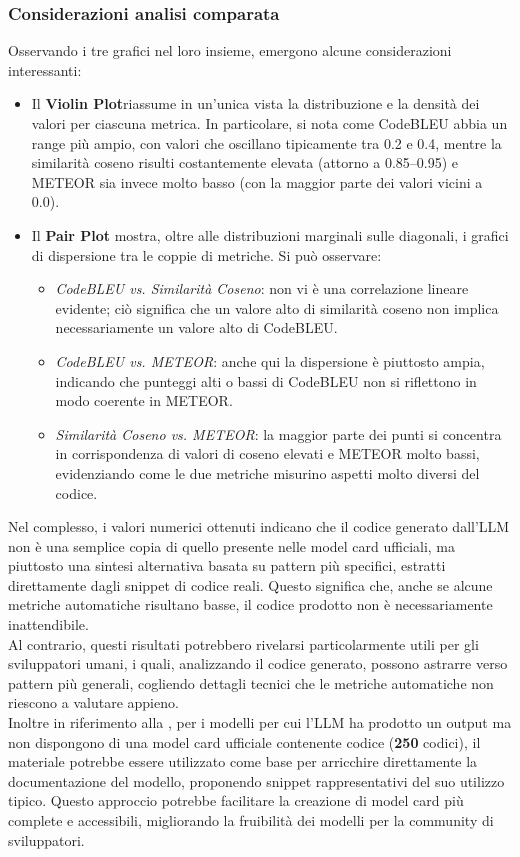 \documentclass{article}
\begin{document}
\subsubsection{Considerazioni analisi comparata} 
Osservando i tre grafici nel loro insieme, emergono alcune considerazioni interessanti:
\begin{itemize} 
\item Il \textbf{Violin Plot}riassume in un’unica vista la distribuzione e la densità dei valori per ciascuna metrica. In particolare, si nota come CodeBLEU abbia un range più ampio, con valori che oscillano tipicamente tra 0.2 e 0.4, mentre la similarità coseno risulti costantemente elevata (attorno a 0.85--0.95) e METEOR sia invece molto basso (con la maggior parte dei valori vicini a 0.0). 
\item Il \textbf{Pair Plot} mostra, oltre alle distribuzioni marginali sulle diagonali, i grafici di dispersione tra le coppie di metriche. Si può osservare: 
\begin{itemize} \item \textit{CodeBLEU vs. Similarità Coseno}: non vi è una correlazione lineare evidente; ciò significa che un valore alto di similarità coseno non implica necessariamente un valore alto di CodeBLEU. 
\item \textit{CodeBLEU vs. METEOR}: anche qui la dispersione è piuttosto ampia, indicando che punteggi alti o bassi di CodeBLEU non si riflettono in modo coerente in METEOR. 
\item \textit{Similarità Coseno vs. METEOR}: la maggior parte dei punti si concentra in corrispondenza di valori di coseno elevati e METEOR molto bassi, evidenziando come le due metriche misurino aspetti molto diversi del codice. 
\end{itemize} 
\end{itemize}
Nel complesso, i valori numerici ottenuti indicano che il codice generato dall’LLM non è una semplice copia di quello presente nelle model card ufficiali, ma piuttosto una sintesi alternativa basata su pattern più specifici, estratti direttamente dagli snippet di codice reali. Questo significa che, anche se alcune metriche automatiche risultano basse, il codice prodotto non è necessariamente inattendibile. \\
Al contrario, questi risultati potrebbero rivelarsi particolarmente utili per gli sviluppatori umani, i quali, analizzando il codice generato, possono astrarre verso pattern più generali, cogliendo dettagli tecnici che le metriche automatiche non riescono a valutare appieno.\\
Inoltre in riferimento alla , per i modelli per cui l'LLM ha prodotto un output ma non dispongono di una model card ufficiale contenente codice (\textbf{250} codici), il materiale potrebbe essere utilizzato come base per arricchire direttamente la documentazione del modello, proponendo snippet rappresentativi del suo utilizzo tipico. Questo approccio potrebbe facilitare la creazione di model card più complete e accessibili, migliorando la fruibilità dei modelli per la community di sviluppatori.
\end{document}
